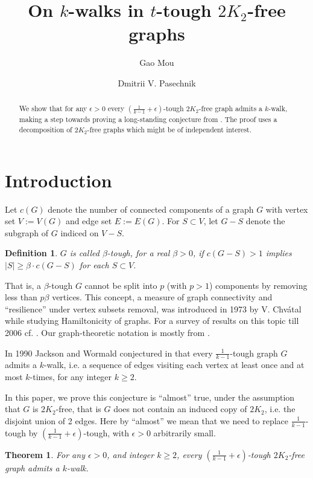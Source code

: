 \documentclass{amsart}
\newtheorem{theorem}{Theorem}
\newtheorem{definition}{Definition}
\newcommand{\ncc}{c}
\begin{document}
\author{Gao Mou}
\address{School of Physical and Mathematical Sciences, Nanyang Technological University, Singapore} 
\author{Dmitrii V. Pasechnik}
\address{Department of Computer Science, The University of Oxford, UK}

\title{On $k$-walks in $t$-tough $2K_2$-free graphs}
\begin{abstract}
We show that for any $\epsilon>0$ every $(\frac{1}{k-1}+\epsilon)$-tough
$2K_2$-free graph admits a $k$-walk, making a step towards proving a
long-standing conjecture from \cite{jackson1990k}. The proof uses a
decomposition of $2K_2$-free graphs which might be of independent interest.
\end{abstract}

\maketitle

\section{Introduction}

Let  $\ncc(G)$ denote the number of connected components of a graph $G$ with vertex set $V:=V(G)$ and edge set $E:=E(G)$. For $S\subset V$, let $G-S$ denote the subgraph of $G$ indiced on $V-S$.
\begin{definition}
$G$ is called $\beta$-{\em tough},
for a real $\beta>0$, if $\ncc(G-S)>1$ implies $|S|\ge \beta\cdot \ncc(G-S)$ 
for each $S\subset V$.
\end{definition}
That is, a $\beta$-tough 
$G$ cannot be split into $p$ (with $p>1$) components by removing less than
$p\beta$ vertices.  
This concept, a measure of graph connectivity and ``resilience'' under vertex subsets removal,
was introduced in 1973 by V. Chv\'{a}tal 
while studying   Hamiltonicity of graphs. For a survey of results on this topic till 2006
cf. \cite{MR2221006}. Our graph-theoretic notation is mostly from \cite{bomu08}.

In 1990 Jackson and Wormald conjectured in \cite{jackson1990k} that every
$\frac{1}{k-1}$-tough graph $G$ admits a $k$-walk, i.e. a sequence of edges
visiting each vertex at least once and at most $k$-times, for any integer $k\ge2$. 

In this paper, we prove this conjecture is ``almost'' true, under the assumption that $G$ is  
$2K_2$-free, 
that is $G$ does not contain an induced copy of $2K_2$, i.e. the disjoint union of 2 edges.
Here by ``almost'' we mean that we need to replace
$\frac{1}{k-1}$-tough by $(\frac{1}{k-1}+\epsilon)$-tough, with $\epsilon>0$
arbitrarily small.
\begin{theorem}\label{thm2}
For any $\epsilon>0$, and integer $k\ge2$,
every $(\frac{1}{k-1}+\epsilon)$-tough $2K_2$-free graph admits a $k$-walk. 
\end{theorem}
\end{document}
